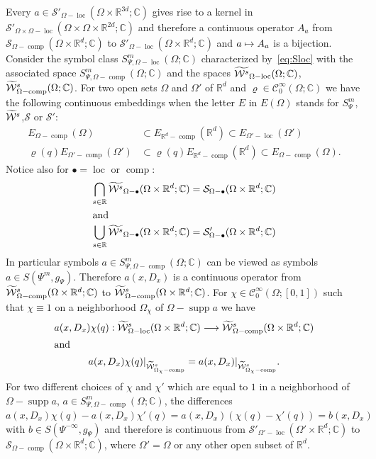 \documentclass[10pt]{amsart}
\theoremstyle{definition}\newtheorem{defi}[theo]{Definition}\newtheorem{rema}[theo]{Remark}\newtheorem{exam}[theo]{Example}\newtheorem{exem}[theo]{Example}\newtheorem{nota}[theo]{Notation}
\newcommand{\C}{\mathbb{C}}
\newcommand{\R}{\mathbb{R}}
\newcommand{\clW}{\mathcal{W}}
\newcommand{\clC}{\mathcal{C}}
\newcommand{\clS}{\mathcal{S}}
\DeclareMathOperator{\ccomp}{comp}
\DeclareMathOperator{\suppp}{supp}
\DeclareMathOperator{\locc}{loc}
\let\oldtilde\tilde
\renewcommand*{\tilde}[1]{\mathchoice{\widetilde{#1}}{\widetilde{#1}}{\oldtilde{#1}}{\oldtilde{#1}}}
\renewcommand*{\to}{\mathchoice{\longrightarrow}{\rightarrow}{\rightarrow}{\rightarrow}}
\let\oldmapsto\mapsto
\renewcommand*{\mapsto}{\mathchoice{\longmapsto}{\oldmapsto}{\oldmapsto}{\oldmapsto}}
\begin{document}
Every $a\in \clS'_{\Omega-\locc}(\Omega\times\R^{3d};\C)$ gives rise to a kernel in $\clS'_{\Omega\times \Omega-\locc}(\Omega\times \Omega\times\R^{2d};\C)$ and therefore a continuous operator $A_{a}$ from $\clS_{\Omega-\ccomp}(\Omega\times \R^{d};\C)$ to $\clS'_{\Omega-\locc}(\Omega\times\R^{d};\C)$ and $a\mapsto A_{a}$ is a bijection. Consider the symbol class $S^{m}_{\Psi,\Omega-\locc}(\Omega;\C)$ characterized by~\eqref{eq:Sloc} with the associated space $S^{m}_{\Psi,\Omega-\ccomp}(\Omega;\C)$ and the spaces $\tilde{\clW^{s}}_{\Omega-{\locc}}(\Omega;\C)$, $\tilde{\clW}^{s}_{\Omega-\ccomp}(\Omega;\C)$. For two open sets $\Omega$ and $\Omega'$ of $\R^{d}$ and $\varrho\in \clC^{\infty}_{0}(\Omega;\C)$ we have the following continuous embeddings when the letter $E$ in $E(\Omega)$ stands for $S^{m}_{\Psi}$, $\tilde{\clW}^{s}$,\linebreak $\clS$ or $\clS'$:
\begin{align*}
E_{\Omega-\ccomp}(\Omega)&\subset E_{\R^{d}-\ccomp}(\R^{d})\subset E_{\Omega'-\locc}(\Omega')\\
\varrho(q)E_{\Omega'-\ccomp}(\Omega')&\subset \varrho(q)E_{\R^{d}-\ccomp}(\R^{d})\subset E_{\Omega-\ccomp}(\Omega).
\end{align*}
Notice also for $\bullet=\locc$ or $\ccomp$:
\begin{align*}
\bigcap_{s\in \R}\tilde{\clW^{s}}_{\Omega-\bullet}(\Omega\times\R^{d};\C)&=\clS_{\Omega-\bullet}(\Omega\times\R^{d};\C)\\
\intertext{and}
\bigcup_{s\in \R}\tilde{\clW^{s}}_{\Omega-\bullet}(\Omega\times\R^{d};\C)&=\clS_{\Omega-\bullet}'(\Omega\times\R^{d};\C)
\end{align*}
\pagebreak{}
\noindent
In particular symbols $a\in S^{m}_{\Psi,\Omega-\ccomp}(\Omega;\C)$ can be viewed as symbols $a\in S(\Psi^{m},g_{\Psi})$. Therefore $a(x,D_{x})$ is a continuous operator from $\tilde{\clW}^{s}_{\Omega-\ccomp}(\Omega\times\R^{d};\C)$ to $\tilde{\clW}^{s}_{\Omega-\ccomp}(\Omega\times\R^{d};\C)$. For $\chi\in \clC^{\infty}_{0}(\Omega;[0,1])$ such that $\chi\equiv 1$ on a neighborhood $\Omega_{\chi}$ of $\Omega-\suppp a$ we have
\begin{gather*}
a(x,D_{x})\chi(q):\tilde{\clW}^{s}_{\Omega-\locc}(\Omega\times\R^{d};\C)\to
\tilde{\clW}^{s}_{\Omega-\ccomp}(\Omega\times\R^{d};\C)\\
\intertext{and} a(x,D_{x})\chi(q)|_{\widetilde{\clW}^{s}_{\Omega_{\chi}-\ccomp}}=a(x,D_{x})|_{\widetilde{\clW}^{s}_{\Omega_{\chi}-\ccomp}}.
\end{gather*}
For two different choices of $\chi$ and $\chi'$ which are equal to $1$ in a neighborhood of $\Omega-\suppp a$, $a\in S^{m}_{\Psi,\Omega-\ccomp}(\Omega;\C)$, the differences $a(x,D_{x})\chi(q)-a(x,D_{x})\chi'(q)=a(x,D_{x})(\chi(q)-\chi'(q))=b(x,D_{x})$ with $b\in S(\Psi^{-\infty},g_{\Psi})$ and therefore is continuous from $\clS'_{\Omega'-\locc}(\Omega'\times\R^{d};\C)$ to $\clS_{\Omega-\ccomp}(\Omega\times\R^{d};\C)$, where $\Omega'=\Omega$ or any other open subset of $\R^{d}$.
\end{document}
